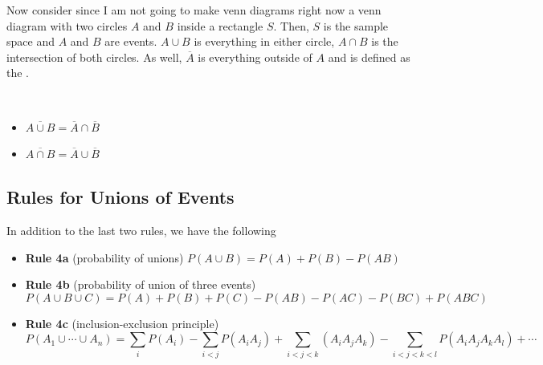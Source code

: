 \documentclass[english, 11pt]{article}
\begin{document}
  Now consider since I am not going to make venn diagrams right now a venn diagram with two circles $A$ and $B$ inside a rectangle $S$. Then, $S$ is the sample space and $A$ and $B$ are events. $A \cup B$ is everything in either circle, $A \cap B$ is the intersection of both circles. As well, $\overline{A}$ is everything outside of $A$ and is defined as the . \\
\newcommand{\ov}[1]{\overline{#1}}
  \begin{thrm}\label{demorgan}
  \
    \begin{itemize}
      \item $\overline{A \cup B} = \overline{A} \cap \overline{B}$
      \item $\ov{A \cap B} = \ov{A} \cup \ov{B}$
    \end{itemize}
  \end{thrm}




  \subsection{Rules for Unions of Events}

  In addition to the last two rules, we have the following

  \begin{itemize}
    \item \textbf{Rule 4a} (probability of unions) $P(A \cup B) = P(A) + P(B) - P(AB)$
    \item \textbf{Rule 4b} (probability of union of three events)
    \[P(A \cup B \cup C) = P(A) + P(B) + P(C) - P(AB) - P(AC) - P(BC) + P(ABC)\]
    \item \textbf{Rule 4c} (inclusion-exclusion principle)
    \[ P(A_1 \cup \cdots \cup A_n) = \sum_i P(A_i) - \sum_{i < j} P(A_iA_j) + \sum_{i<j<k}(A_iA_jA_k) -\sum_{i < j < k < l}P(A_iA_jA_kA_l) + \cdots \]
  \end{itemize}
\end{document}
